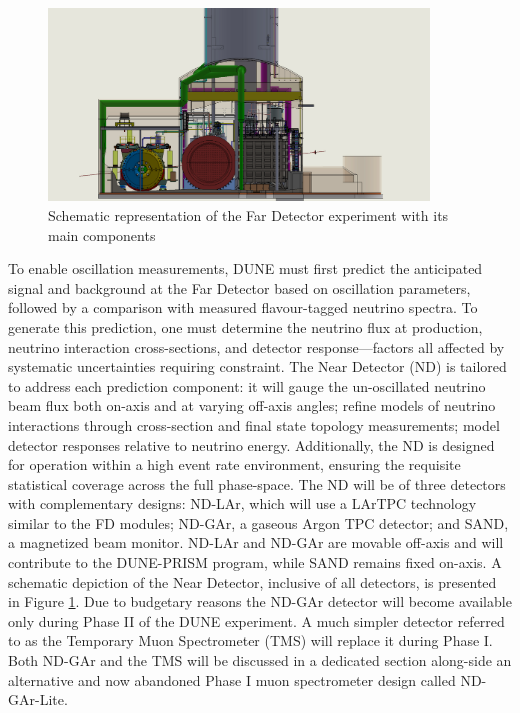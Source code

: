 \begin{figure}[!h]
     \centering
     \includegraphics[width=0.9\textwidth]{figures/ch3-DUNE/ndhall.JPG}
     \caption{Schematic representation of the Far Detector experiment with its main components}
        \label{fig:NDhall}
\end{figure}

To enable oscillation measurements, DUNE must first predict the anticipated signal and background at the Far Detector based on oscillation parameters, followed by a comparison with measured flavour-tagged neutrino spectra. To generate this prediction, one must determine the neutrino flux at production, neutrino interaction cross-sections, and detector response—factors all affected by systematic uncertainties requiring constraint. The Near Detector (ND) is tailored to address each prediction component: it will gauge the un-oscillated neutrino beam flux both on-axis and at varying off-axis angles; refine models of neutrino interactions through cross-section and final state topology measurements; model detector responses relative to neutrino energy. Additionally, the ND is designed for operation within a high event rate environment, ensuring the requisite statistical coverage across the full phase-space. The ND will be of three detectors with complementary designs: ND-LAr, which will use a LArTPC technology similar to the FD modules; ND-GAr, a gaseous Argon TPC detector; and SAND, a magnetized beam monitor. ND-LAr and ND-GAr are movable off-axis and will contribute to the DUNE-PRISM program, while SAND remains fixed on-axis. A schematic depiction of the Near Detector, inclusive of all detectors, is presented in Figure \ref{fig:NDhall}. Due to budgetary reasons the ND-GAr detector will become available only during Phase II of the DUNE experiment. A much simpler detector referred to as the Temporary Muon Spectrometer (TMS) will replace it during Phase I. Both ND-GAr and the TMS will be discussed in a dedicated section along-side an alternative and now abandoned Phase I muon spectrometer design called ND-GAr-Lite. 

